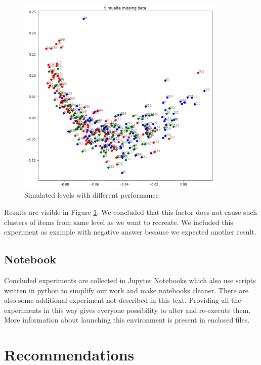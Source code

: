 \documentclass[
  digital, %
  table,   %
  nolof,     %
  nolot,     %
  nocover,
  color
]{fithesis3}
\begin{document}
\begin{figure}
  \includegraphics[width=10cm]{img/simulated_performance}
  \caption{Simulated levels with different performance}
  \label{fig:simulated_performance}
\end{figure}


Results are visible in Figure \ref{fig:simulated_performance}. We concluded that this factor does not cause such clusters of items from same level as we want to recreate. We included this experiment as example with negative answer because we expected another result.


\section{Notebook}\label{notebook}

Concluded experiments are collected in Jupyter Notebooks which also use scripts written in python to simplify our work and make notebooks cleaner. There are also some additional experiment not described in this text. Providing all the experiments in this way gives everyone possibility to alter and re-execute them. More information about launching this environment is present in enclosed files.

\chapter{Recommendations}\label{recommendations}

\end{document}
